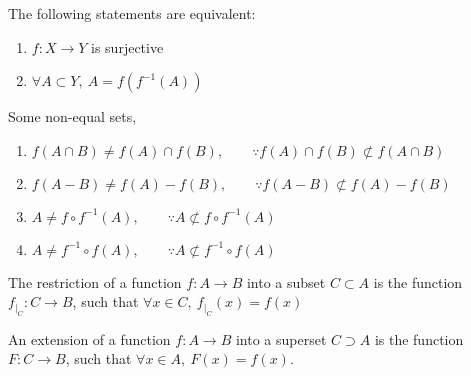 	\begin{remark}The following statements are equivalent:
		\begin{enumerate}
			\item $f : X \to Y$ is surjective
		 	\item $\forall A \subset Y,\ A = f(f^{-1}(A))$
		\end{enumerate}
	\end{remark}
	\begin{remark} Some non-equal sets,
		\begin{enumerate}
			 \item $f(A\cap B) \neq f(A) \cap f(B),\qquad \because f(A) \cap f(B) \not\subset f(A\cap B)$
			 \item $f(A-B) \neq f(A)-f(B),\qquad  \because f(A-B) \not\subset f(A)-f(B)$
			 \item $A \neq f \circ f^{-1}(A),\qquad \because A \not\subset f \circ f^{-1}(A)$
			 \item $A \neq f^{-1} \circ f(A),\qquad \because A \not\subset f^{-1}\circ f(A)$
		\end{enumerate}
	\end{remark}
	\begin{definition}
		The restriction of a function $f:A \to B$ into a subset $C \subset A$ is the function $f_{|_C} : C \to B$, such that $\forall x \in C,\ f_{|_C}(x) = f(x)$
	\end{definition}
	\begin{definition}
		An extension of a function $f:A \to B$ into a superset $C \supset A$ is the function $F:C \to B$, such that $\forall x \in A,\ F(x)=f(x)$.
	\end{definition}
